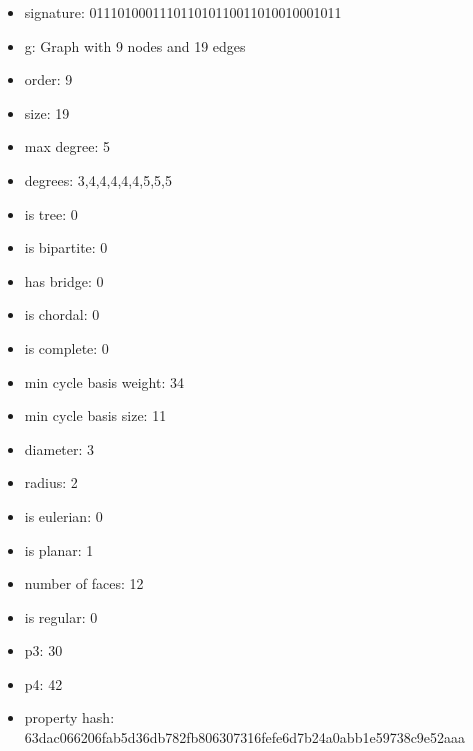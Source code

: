 \newpage
\begin{figure}
\end{figure}
\begin{itemize}
\item signature: 011101000111011010110011010010001011
\item g: Graph with 9 nodes and 19 edges
\item order: 9
\item size: 19
\item max degree: 5
\item degrees: 3,4,4,4,4,4,5,5,5
\item is tree: 0
\item is bipartite: 0
\item has bridge: 0
\item is chordal: 0
\item is complete: 0
\item min cycle basis weight: 34
\item min cycle basis size: 11
\item diameter: 3
\item radius: 2
\item is eulerian: 0
\item is planar: 1
\item number of faces: 12
\item is regular: 0
\item p3: 30
\item p4: 42
\item property hash: 63dac066206fab5d36db782fb806307316fefe6d7b24a0abb1e59738c9e52aaa
\end{itemize}
